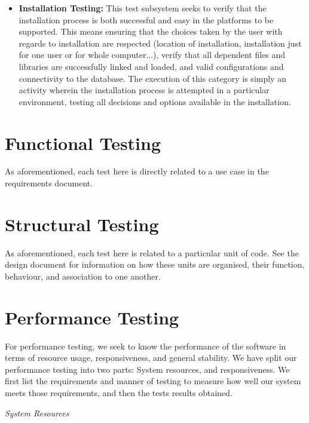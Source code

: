 \documentclass[12pt]{article}
\newcounter{req ID}
\begin{document}
\begin{itemize}
    \item \textbf{Installation Testing:} This test subsystem seeks to verify that the installation process is both successful and easy in the platforms to be supported. This means ensuring that the choices taken by the user with regards to installation are respected (location of installation, installation just for one user or for whole computer...), verify that all dependent files and libraries are successfully linked and loaded, and valid configurations and connectivity to the database. The execution of this category is simply an activity wherein the installation process is attempted in a particular environment, testing all decisions and options available in the installation.
\end{itemize}

\section{Functional Testing}

As aforementioned, each test here is directly related to a use case in the requirements document.



\section{Structural Testing}

As aforementioned, each test here is related to a particular unit of code. See the design document for information on how these units are organised, their function, behaviour, and association to one another.


\section{Performance Testing}

For performance testing, we seek to know the performance of the software in terms of resource usage, responsiveness, and general stability. We have split our performance testing into two parts: System resources, and responsiveness. We first list the requirements and manner of testing to measure how well our system meets those requirements, and then the tests results obtained.

\textit{System Resources}
\end{document}
